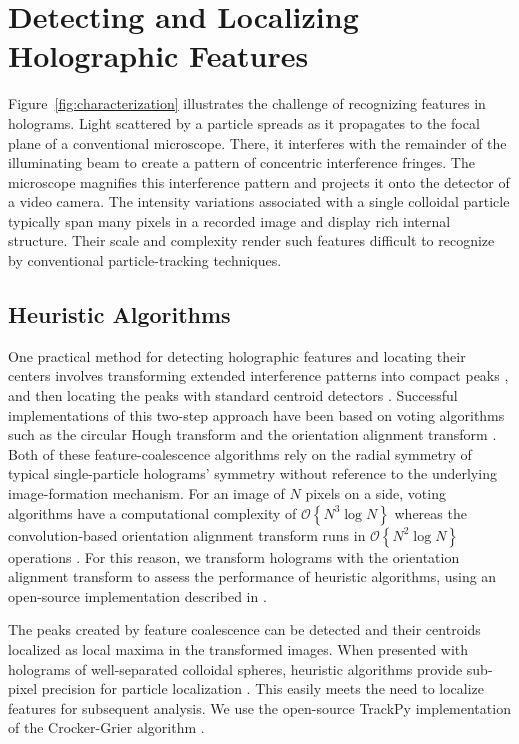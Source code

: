 \documentclass[10pt,letterpaper]{article}
\newcommand{\order}[1]{\mathcal{O}\!\left\{ #1 \right\}}
\begin{document}
\section{Detecting and Localizing Holographic Features}

Figure~\ref{fig:characterization} illustrates the challenge of
recognizing features in holograms.
Light scattered by a particle 
spreads as it propagates to the focal plane of a conventional
microscope.
There, it interferes with the remainder of the illuminating beam
to create a pattern of concentric interference fringes.
The microscope magnifies this interference pattern and
projects it onto
the detector of a video camera.
The intensity variations
associated with a single colloidal particle
typically span many pixels in a recorded image
and display rich internal structure.
Their scale and complexity render such features difficult to
recognize by conventional
particle-tracking techniques.
  
\subsection{ Heuristic Algorithms}
\label{sec:heuristic}

One practical method for detecting holographic features and 
locating their centers involves transforming extended interference
patterns into compact peaks \cite{cheong09,krishnatreya14a}, and 
then locating the peaks with standard centroid detectors 
\cite{crocker96,allan16trackpy}. 
Successful implementations of this two-step
approach have been based on
voting algorithms such as the circular Hough transform
\cite{cheong09,parthasarathy12,allan16trackpy} and
the orientation alignment transform \cite{krishnatreya14a}.
Both of these feature-coalescence algorithms rely on the
radial symmetry of typical single-particle holograms'
symmetry without reference to the underlying image-formation
mechanism.
For an image of $N$ pixels on a side, voting algorithms
have a computational complexity of $\order{N^3 \log N}$
\cite{hollitt13} whereas the convolution-based orientation alignment
transform
runs in $\order{N^2 \log N}$ operations \cite{cheong09}.
For this reason, we transform holograms with the
orientation alignment transform
to assess the performance of heuristic algorithms,
using an open-source implementation described
in \cite{cheong09}.

The peaks created by feature coalescence can be detected
and their centroids localized as local maxima in the transformed images.
When presented with holograms of well-separated
colloidal spheres, heuristic algorithms provide
sub-pixel precision for particle localization
\cite{cheong09,krishnatreya14a}.
This easily meets the need to localize
features for subsequent analysis.
We use the open-source
TrackPy implementation \cite{allan16trackpy}
of the Crocker-Grier algorithm \cite{crocker96}.
\end{document}

